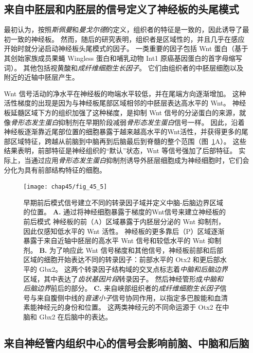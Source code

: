 \subsection{来自中胚层和内胚层的信号定义了神经板的头尾模式}

最初认为，按照\textit{斯佩曼}和\textit{曼戈尔德}的定义，组织者的特征是一致的，因此诱导了最初一致的神经板。
然而，随后的研究表明，组织者是区域性的，并且几乎在感应开始时就分泌启动神经板头尾模式的因子。
一类重要的因子包括 Wnt 蛋白（基于其创始家族成员果蝇 Wingless 蛋白和哺乳动物 Int1 原癌基因蛋白的首字母缩写词）。
其他包括视黄酸和\textit{成纤维细胞生长因子}。
它们由组织者的中胚层细胞以及附近的近轴中胚层产生。


Wnt 信号活动的净水平在神经板的吻端水平较低，并在尾端方向逐渐增加。
这种活性梯度的出现是因为与神经板尾部区域相邻的中胚层表达高水平的 Wnt。
神经板延髓区域下方的组织加强了这种梯度，是抑制 Wnt 信号的分泌蛋白的来源，就像\textit{骨形态发生蛋白}抑制剂在早期阶段减弱\textit{骨形态发生蛋白}信号一样。
因此，沿着神经板逐渐靠近尾部位置的细胞暴露于越来越高水平的Wnt活性，并获得更多的尾部区域特征，跨越从前脑到中脑再到后脑最后到脊髓的整个范围（图~\ref{fig:45_5}A）。
这些结果表明，前部特征是神经组织的“默认”状态，Wnt 等信号强加了后部特征。
实际上，当通过应用\textit{骨形态发生蛋白}抑制剂诱导外胚层细胞成为神经细胞时，它们会分化为具有前部结构特征的细胞。


\begin{figure}[htbp]
	\centering
	\texttt{[image: chap45/fig\_45\_5]}
	\caption{早期前后模式信号建立不同的转录因子域并定义中脑-后脑边界区域的位置。
		\textbf{A.} 通过将神经细胞暴露于梯度的Wnt信号来建立神经板的前后模式
		神经板的前（A）区域暴露于内胚层分泌的 Wnt 抑制剂，因此仅感知低水平的 Wnt 活性。
		神经板的更多靠后（P）区域逐渐暴露于来自近轴中胚层的高水平 Wnt 信号和较低水平的 Wnt 抑制剂。
		\textbf{B.} 为了响应此 Wnt 信号梯度和其他信号，神经板前部和后部区域的细胞开始表达不同的转录因子：前部水平的 Otx2 和更后部水平的 Gbx2。
		这两个转录因子结构域的交叉点标志着\textit{中脑和后脑边界}区域，其中表达了\textit{齿状基因片段}转录因子。
		然后神经管形成\textit{中脑和后脑边界}前后的部分。
		\textbf{C.} 来自峡部组织者的\textit{成纤维细胞生长因子}信号与来自腹侧中线的\textit{音速小子}信号协同作用，以指定多巴胺能和血清素能神经元的身份和位置。
		这两类神经元的不同命运源于 Otx2 在中脑和 Gbx2 在后脑中的表达\cite{wurst2001neural}。}
	\label{fig:45_5}
\end{figure}



\subsection{来自神经管内组织中心的信号会影响前脑、中脑和后脑}

